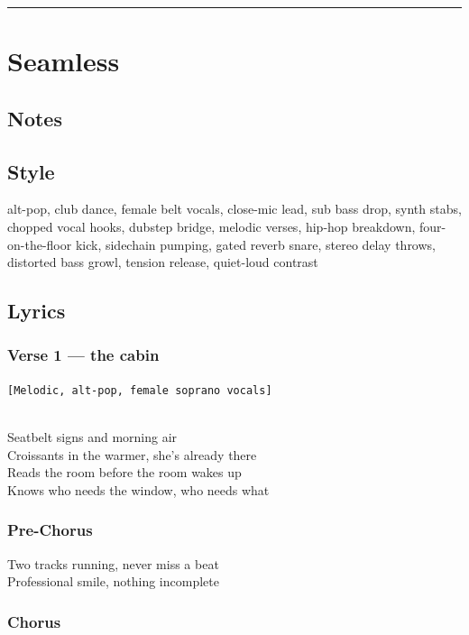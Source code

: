 \begin{center}\rule{0.5\linewidth}{0.5pt}\end{center}

\section{Seamless}\label{seamless}

\subsection{Notes}\label{notes-32}

\subsection{Style}\label{style-31}

alt-pop, club dance, female belt vocals, close-mic lead, sub bass drop,
synth stabs, chopped vocal hooks, dubstep bridge, melodic verses,
hip-hop breakdown, four-on-the-floor kick, sidechain pumping, gated
reverb snare, stereo delay throws, distorted bass growl, tension
release, quiet-loud contrast

\subsection{Lyrics}\label{lyrics-31}

\subsubsection{Verse 1 --- the cabin}\label{verse-1-the-cabin}

\texttt{{[}Melodic,\ alt-pop,\ female\ soprano\ vocals{]}}\strut \\
Seatbelt signs and morning air\\
Croissants in the warmer, she's already there\\
Reads the room before the room wakes up\\
Knows who needs the window, who needs what

\subsubsection{Pre-Chorus}\label{pre-chorus-46}

Two tracks running, never miss a beat\\
Professional smile, nothing incomplete

\subsubsection{Chorus}\label{chorus-67}

